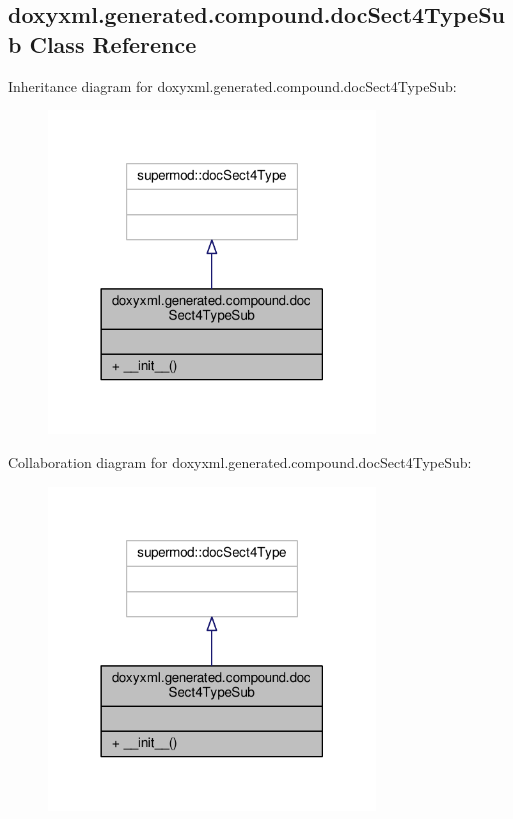 \subsection{doxyxml.\+generated.\+compound.\+doc\+Sect4\+Type\+Sub Class Reference}
\label{classdoxyxml_1_1generated_1_1compound_1_1docSect4TypeSub}


Inheritance diagram for doxyxml.\+generated.\+compound.\+doc\+Sect4\+Type\+Sub\+:
\nopagebreak
\begin{figure}[H]
\begin{center}
\leavevmode
\includegraphics[width=246pt]{d8/dd5/classdoxyxml_1_1generated_1_1compound_1_1docSect4TypeSub__inherit__graph}
\end{center}
\end{figure}


Collaboration diagram for doxyxml.\+generated.\+compound.\+doc\+Sect4\+Type\+Sub\+:
\nopagebreak
\begin{figure}[H]
\begin{center}
\leavevmode
\includegraphics[width=246pt]{da/d20/classdoxyxml_1_1generated_1_1compound_1_1docSect4TypeSub__coll__graph}
\end{center}
\end{figure}

